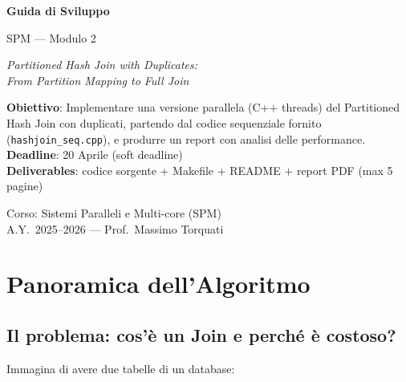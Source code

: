 \documentclass[11pt,a4paper]{article}
\begin{document}
\begin{titlepage}
\centering
\vspace*{3cm}
{\Huge\bfseries\color{MidnightBlue} Guida di Sviluppo\par}
\vspace{0.6cm}
{\LARGE SPM --- Modulo 2\par}
\vspace{0.4cm}
{\Large\itshape Partitioned Hash Join with Duplicates:\\
From Partition Mapping to Full Join\par}
\vspace{2cm}
\begin{tcolorbox}[colback=boxblue,colframe=boxblueframe,width=12cm,arc=4pt]
\centering
\textbf{Obiettivo}: Implementare una versione parallela (C++ threads) del Partitioned Hash Join con duplicati, partendo dal codice sequenziale fornito (\texttt{hashjoin\_seq.cpp}), e produrre un report con analisi delle performance.\\[6pt]
\textbf{Deadline}: 20 Aprile (soft deadline)\\[3pt]
\textbf{Deliverables}: codice sorgente + Makefile + README + report PDF (max 5 pagine)
\end{tcolorbox}
\vspace{1.5cm}
{\large Corso: Sistemi Paralleli e Multi-core (SPM)\\
A.Y.\ 2025--2026 --- Prof.\ Massimo Torquati}
\vfill
\end{titlepage}

\tableofcontents
\clearpage

\section{Panoramica dell'Algoritmo}

\subsection{Il problema: cos'è un Join e perché è costoso?}

Immagina di avere due tabelle di un database:
\end{document}
